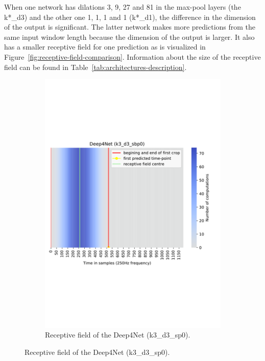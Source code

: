When one network has dilations 3, 9, 27 and 81 in the max-pool layers (the k*\_d3) and the other one 1, 1, 1 and 1 (k*\_d1), the difference in the dimension of the output is significant.
The latter network makes more predictions from the same input window length because the dimension of the output is larger.
It also has a smaller receptive field for one prediction as is visualized in Figure~\ref{fig:receptive-field-comparison}.
Information about the size of the receptive field can be found in Table~\ref{tab:architectures-description}.

\begin{figure}[!htpb]
\centering
\begin{subfigure}[b]{0.44\textwidth}
   \includegraphics[width=\linewidth]{img/ch3/deep4net-receptive-field}
   \caption{Receptive field of the Deep4Net (k3\_d3\_sp0).}
\end{subfigure}

\end{figure}

